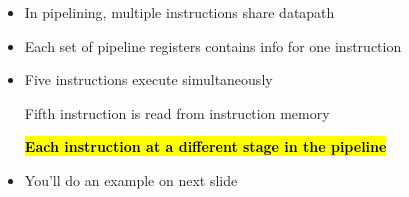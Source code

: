 





\begin{frame}[fragile]
	\begin{itemize}
		\item In pipelining, multiple instructions share datapath

		\item Each set of pipeline registers contains info for one instruction

		\item Five instructions execute simultaneously
  
  Fifth instruction is read from instruction memory

			\hl{\textbf{Each instruction at a different stage in the pipeline}}
	\end{itemize}
\BNotes\ifnum{}
\begin{itemize}
\item You'll do an example on next slide
\end{itemize}
\fi\ENotes
\end{frame}

